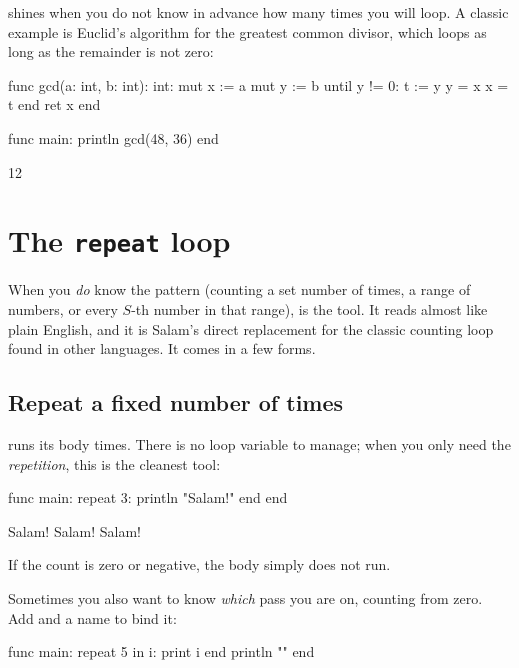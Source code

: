 shines when you do not know in advance how many times you will loop.
A classic example is Euclid's algorithm for the greatest common divisor, which
loops as long as the remainder is not zero:

\begin{salamen}
func gcd(a: int, b: int): int:
    mut x := a
    mut y := b
    until y != 0:
        t := y
        y = x %
        x = t
    end
    ret x
end

func main:
    println gcd(48, 36)
end
\end{salamen}

\begin{progout}
12
\end{progout}

\section{The \texttt{repeat} loop}

When you \emph{do} know the pattern (counting a set number of times, a range
of numbers, or every $S$-th number in that range),  is the tool.
It reads almost like plain English, and it is Salam's direct replacement for the
classic counting loop found in other languages. It comes in a few forms.

\subsection{Repeat a fixed number of times}

 runs its body  times. There is no loop variable to
manage; when you only need the \emph{repetition}, this is the cleanest tool:

\begin{salamen}
func main:
    repeat 3:
        println "Salam!"
    end
end
\end{salamen}

\begin{progout}
Salam!
Salam!
Salam!
\end{progout}

If the count is zero or negative, the body simply does not run.

Sometimes you also want to know \emph{which} pass you are on, counting from
zero. Add  and a name to bind it:

\begin{salamen}
func main:
    repeat 5 in i:
        print i
    end
    println ""
end
\end{salamen}

